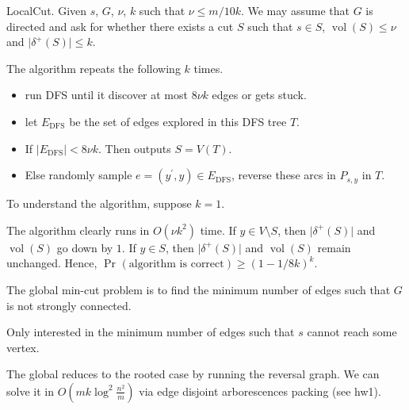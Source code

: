LocalCut. Given \(s\), \(G\), \(\nu \), \(k\) such that \(\nu \leq m / 10k\). We may assume that \(G\) is directed and ask for whether there exists a cut \(S\) such that \(s \in S\), \(\operatorname{vol}(S) \leq \nu \) and \(\lvert \delta ^+(S) \rvert \leq k\).

The algorithm repeats the following \(k\) times.

\begin{itemize}
	\item run DFS until it discover at most \(8 \nu k\) edges or gets stuck.
	\item let \(E_{\mathrm{DFS} }\) be the set of edges explored in this DFS tree \(T\).
	\item If \(\lvert E_{\mathrm{DFS} } \rvert < 8 \nu k\). Then outputs \(S = V(T)\).
	\item Else randomly sample \(e = (y^{\prime} , y) \in E_{\mathrm{DFS} }\), reverse these arcs in \(P_{s, y}\) in \(T\).
\end{itemize}

To understand the algorithm, suppose \(k = 1\).

The algorithm clearly runs in \(O(\nu k^2)\) time. If \(y \in V\setminus S\), then \(\lvert \delta ^+(S) \rvert \) and \(\operatorname{vol}(S) \) go down by \(1\). If \(y \in S\), then \(\lvert \delta ^+(S) \rvert \) and \(\operatorname{vol}(S) \) remain unchanged. Hence, \(\Pr_{}(\text{algorithm is correct} ) \geq (1 - 1 / 8k)^k\).

The global min-cut problem is to find the minimum number of edges such that \(G\) is not strongly connected.

\begin{problem}
Only interested in the minimum number of edges such that \(s\) cannot reach some vertex.
\end{problem}

The global reduces to the rooted case by running the reversal graph. We can solve it in \(O(mk \log ^2 \frac{n^2}{m})\) via edge disjoint arborescences packing (see hw1).